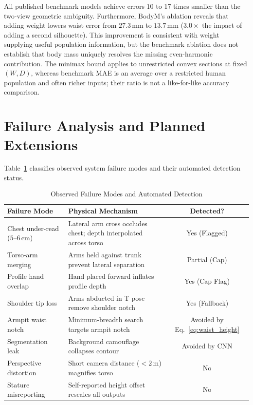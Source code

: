 \documentclass[journal]{IEEEtran}
\begin{document}
All published benchmark models achieve errors $10$ to $17$ times smaller than the two-view geometric ambiguity. Furthermore, BodyM's ablation reveals that adding weight lowers waist error from $27.3$\,mm to $13.7$\,mm ($3.0\times$ the impact of adding a second silhouette). This improvement is consistent with weight supplying useful population information, but the benchmark ablation does not establish that body mass uniquely resolves the missing even-harmonic contribution. The minimax bound applies to unrestricted convex sections at fixed $(W,D)$, whereas benchmark MAE is an average over a restricted human population and often richer inputs; their ratio is not a like-for-like accuracy comparison.

\section{Failure Analysis and Planned Extensions}
\label{sec:failure_modes}
\label{subsec:future_work}

Table~\ref{tab:failure_modes} classifies observed system failure modes and their automated detection status.

\begin{table}[!t]
\caption{Observed Failure Modes and Automated Detection}
\label{tab:failure_modes}
\centering
\begin{tabular}{p{2.3cm}p{3.4cm}c}
\toprule
\textbf{Failure Mode} & \textbf{Physical Mechanism} & \textbf{Detected?} \\
\midrule
Chest under-read ($5$--$6$\,cm) & Lateral arm cross occludes chest; depth interpolated across torso & Yes (Flagged) \\
Torso-arm merging & Arms held against trunk prevent lateral separation & Partial (Cap) \\
Profile hand overlap & Hand placed forward inflates profile depth & Yes (Cap Flag) \\
Shoulder tip loss & Arms abducted in T-pose remove shoulder notch & Yes (Fallback) \\
Armpit waist notch & Minimum-breadth search targets armpit notch & Avoided by Eq.~\eqref{eq:waist_height} \\
Segmentation leak & Background camouflage collapses contour & Avoided by CNN \\
Perspective distortion & Short camera distance ($<2$\,m) magnifies torso & No \\
Stature misreporting & Self-reported height offset rescales all outputs & No \\
\bottomrule
\end{tabular}
\end{table}
\end{document}
